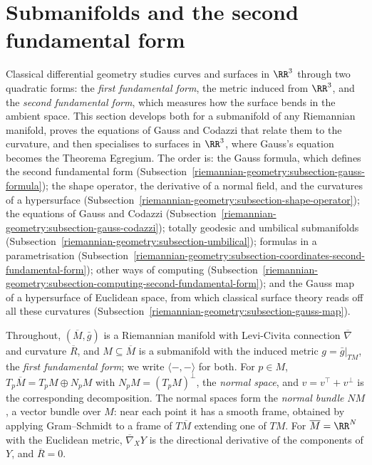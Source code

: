 \section{Submanifolds and the second fundamental form}\label{riemannian-geometry:section-submanifolds}

Classical differential geometry studies curves and surfaces in $\RR^3$ through two quadratic forms: the \emph{first fundamental form}, the metric induced from
$\RR^3$, and the \emph{second fundamental form}, which measures how the surface bends in the ambient space. This section develops both for a submanifold of
any Riemannian manifold, proves the equations of Gauss and Codazzi that relate them to the curvature, and then specialises to surfaces in $\RR^3$, where Gauss's
equation becomes the Theorema Egregium. The order is: the Gauss formula, which defines the second fundamental form (Subsection~\ref{riemannian-geometry:subsection-gauss-formula}); the shape operator, the derivative of a normal field, and the curvatures of a hypersurface (Subsection~\ref{riemannian-geometry:subsection-shape-operator}); the equations of Gauss and Codazzi (Subsection~\ref{riemannian-geometry:subsection-gauss-codazzi}); totally geodesic and umbilical submanifolds (Subsection~\ref{riemannian-geometry:subsection-umbilical}); formulas in a parametrisation (Subsection~\ref{riemannian-geometry:subsection-coordinates-second-fundamental-form}); other ways of computing (Subsection~\ref{riemannian-geometry:subsection-computing-second-fundamental-form}); and the Gauss map of a hypersurface of Euclidean space, from which classical surface theory reads off all these curvatures (Subsection~\ref{riemannian-geometry:subsection-gauss-map}).

Throughout, $(\overline{M}, \bar{g})$ is a Riemannian manifold with Levi-Civita connection $\overline{\nabla}$ and curvature $\overline{R}$, and
$M \subseteq \overline{M}$ is a submanifold with the induced metric $g = \bar{g}|_{TM}$, the \emph{first fundamental form}; we write $\langle -, - \rangle$ for
both. For $p \in M$, $T_p\overline{M} = T_pM \oplus N_pM$ with $N_pM = (T_pM)^\perp$, the \emph{normal space}, and $v = v^\top + v^\perp$ is the corresponding
decomposition. The normal spaces form the \emph{normal bundle} $NM$, a vector bundle over $M$: near each point it has a smooth frame, obtained by applying
Gram--Schmidt to a frame of $T\overline{M}$ extending one of $TM$. For $\overline{M} = \RR^N$ with the Euclidean metric, $\overline{\nabla}_XY$ is the directional
derivative of the components of $Y$, and $\overline{R} = 0$.

